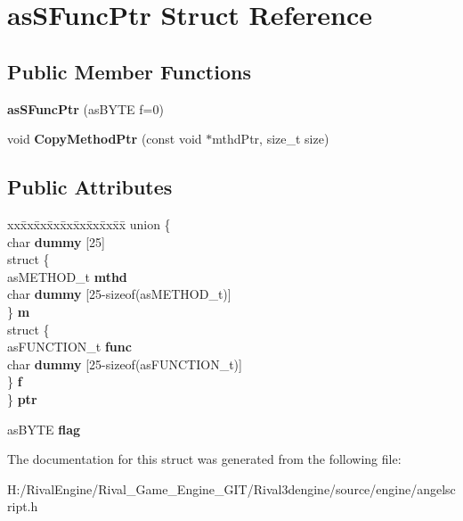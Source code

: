 \hypertarget{structas_s_func_ptr}{}\section{as\+S\+Func\+Ptr Struct Reference}
\label{structas_s_func_ptr}
\subsection*{Public Member Functions}
\begin{DoxyCompactItemize}
\item 
\mbox{\label{structas_s_func_ptr_a474419e80b310972b557eb4ba77115cd}} 
{\bfseries as\+S\+Func\+Ptr} (as\+B\+Y\+TE f=0)
\item 
\mbox{\label{structas_s_func_ptr_a0c7c0492bd1a8f02bbc83209d767f38f}} 
void {\bfseries Copy\+Method\+Ptr} (const void $\ast$mthd\+Ptr, size\+\_\+t size)
\end{DoxyCompactItemize}
\subsection*{Public Attributes}
\begin{DoxyCompactItemize}
\item 
\mbox{\label{structas_s_func_ptr_a5d5de83d919140835a3aa80c7f10c1bb}} 
\begin{tabbing}
xx\=xx\=xx\=xx\=xx\=xx\=xx\=xx\=xx\=\kill
union \{\\
\>char {\bfseries dummy} \mbox{[}25\mbox{]}\\
\>struct \{\\
\>\>asMETHOD\_t {\bfseries mthd}\\
\>\>char {\bfseries dummy} \mbox{[}25-\/sizeof(asMETHOD\_t)\mbox{]}\\
\>\} {\bfseries m}\\
\>struct \{\\
\>\>asFUNCTION\_t {\bfseries func}\\
\>\>char {\bfseries dummy} \mbox{[}25-\/sizeof(asFUNCTION\_t)\mbox{]}\\
\>\} {\bfseries f}\\
\} {\bfseries ptr}\\

\end{tabbing}\item 
\mbox{\label{structas_s_func_ptr_a0c08acd4f82ceaa04e4d0aae525a546f}} 
as\+B\+Y\+TE {\bfseries flag}
\end{DoxyCompactItemize}


The documentation for this struct was generated from the following file\+:\begin{DoxyCompactItemize}
\item 
H\+:/\+Rival\+Engine/\+Rival\+\_\+\+Game\+\_\+\+Engine\+\_\+\+G\+I\+T/\+Rival3dengine/source/engine/angelscript.\+h\end{DoxyCompactItemize}
